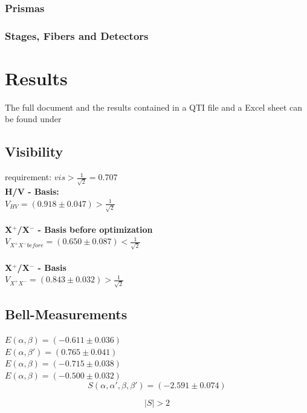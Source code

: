 \documentclass[12pt,a4paper]{article}
\begin{document}
\begin{multicols}{2}
\subsubsection{Prismas}
\subsubsection{Stages, Fibers and Detectors}

\section{Results}
The full document and the results contained in a QTI file and a Excel sheet can be found under \cite{github}
\subsection{Visibility}
requirement: $vis > \frac{1}{\sqrt{2}} = 0.707$\\

\noindent \textbf{H/V - Basis:}\\

$V_{HV}= (0.918 \pm 0.047) > \frac{1}{\sqrt{2}}$\\
\\
\textbf{X$^+$/X$^-$ - Basis before optimization}\\

$V_{X^+ X^- before}=(0.650 \pm 0.087) < \frac{1}{\sqrt{2}}$\\
\\
\textbf{X$^+$/X$^-$ - Basis}\\

$V_{X^+ X^- }=(0.843 \pm 0.032) > \frac{1}{\sqrt{2}}$\\

\subsection{Bell-Measurements}
$E(\alpha, \beta) = (-0.611 \pm 0.036)$\\
$E(\alpha, \beta ') = (0.765 \pm 0.041)$\\
$E(\alpha, \beta) = (-0.715\pm 0.038)$\\
$E(\alpha, \beta) = (-0.500 \pm 0.032)$\\

$$S(\alpha, \alpha ', \beta , \beta ') = (-2.591 \pm 0.074)$$

$$|S| > 2$$\\


\end{multicols}
\end{document}
